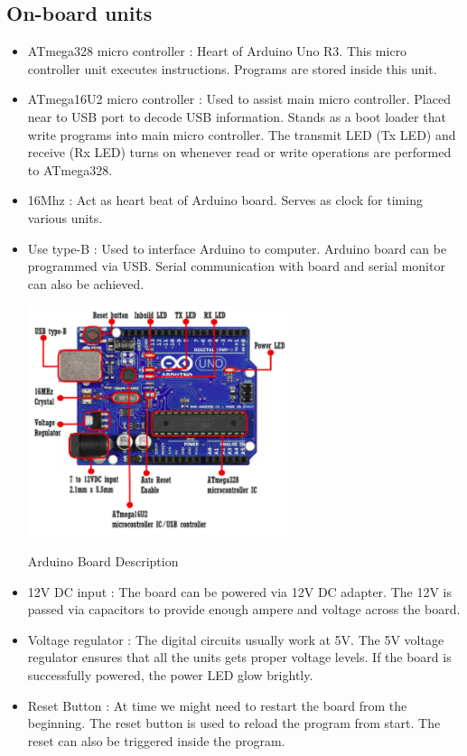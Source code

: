 \subsection{On-board units}
\begin{itemize}
    \item ATmega328 micro controller : Heart of Arduino Uno R3. This micro controller unit executes instructions. Programs are stored inside this unit.
    \item ATmega16U2 micro controller : Used to assist main micro controller. Placed near to USB port to decode USB information. Stands as a boot loader that write programs into main micro controller. The transmit LED (Tx LED) and receive (Rx LED) turns on whenever read or write operations are performed to ATmega328. 
    \item 16Mhz : Act as heart beat of Arduino board. Serves as clock for timing various units.
    \item Use type-B : Used to interface Arduino to computer. Arduino board can be programmed via USB. Serial communication with board and serial monitor can also be achieved.
    \begin{marginfigure}
     \hspace{-1in}\includegraphics[width=3in]{Chapters/images/ard_boarddesp.png}
    \caption{Arduino Board Description}
    \end{marginfigure} 
    \item 12V DC input : The board can be powered via 12V DC adapter. The 12V is passed via capacitors to provide enough ampere and voltage across the board.
    \item Voltage regulator : The digital circuits usually work at 5V. The 5V voltage regulator ensures that all the units gets proper voltage levels. If the board is successfully powered, the power LED glow brightly.
    \item Reset Button : At time we might need to restart the board from the beginning. The reset button is used to reload the program from start. The reset can also be triggered inside the program.
\end{itemize}


